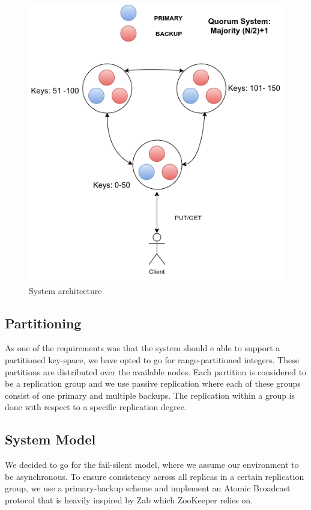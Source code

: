 \documentclass[12pt]{article}
\begin{document}
\begin{figure}[H]
  \centering
  \includegraphics[scale=0.6,clip]{img/architecture}
  \caption[Caption for LOF]{System architecture}  
  \label{fig:picture}
\end{figure}

\subsection{Partitioning}
As one of the requirements was that the system should e able to support a partitioned key-space, we have opted to go for range-partitioned integers. These partitions are distributed over the available nodes. Each partition is considered to be a replication group and we use passive replication where each of these groups consist of one primary and multiple backups. The replication within a group is done with respect to a specific replication degree.

\subsection{System Model}
We decided to go for the fail-silent model, where we assume our environment to be asynchronous. To ensure consistency across all replicas in a certain replication group, we use a primary-backup scheme and implement an Atomic Broadcast protocol that is heavily inspired by Zab \cite{Junqueira:2011:ZHB:2056308.2056409} which ZooKeeper \cite{Hunt:2010:ZWC:1855840.1855851} relies on.
\end{document}
